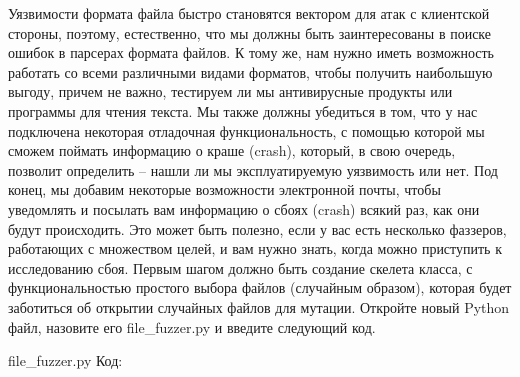 \documentclass[12pt]{book}
\begin{document}
Уязвимости формата файла быстро становятся вектором для атак с клиентской стороны, поэтому, естественно, что мы должны быть заинтересованы в поиске ошибок в парсерах формата файлов. К тому же, нам нужно иметь возможность работать со всеми различными видами форматов, чтобы получить наибольшую выгоду, причем не важно, тестируем ли мы антивирусные продукты или программы для чтения текста. Мы также должны убедиться в том, что у нас подключена некоторая отладочная функциональность, с помощью которой мы сможем поймать информацию о краше (crash), который, в свою очередь, позволит определить – нашли ли мы эксплуатируемую уязвимость или нет. Под конец, мы добавим некоторые возможности электронной почты, чтобы уведомлять и посылать вам информацию о сбоях (crash) всякий раз, как они будут происходить. Это может быть полезно, если у вас есть несколько фаззеров, работающих с множеством целей, и вам нужно знать, когда можно приступить к исследованию сбоя. Первым шагом должно быть создание скелета класса, с функциональностью простого выбора файлов (случайным образом), которая будет заботиться об открытии случайных файлов для мутации. Откройте новый Python файл, назовите его file\_fuzzer.py и введите следующий код.

file\_fuzzer.py
Код:





        
\end{document}
